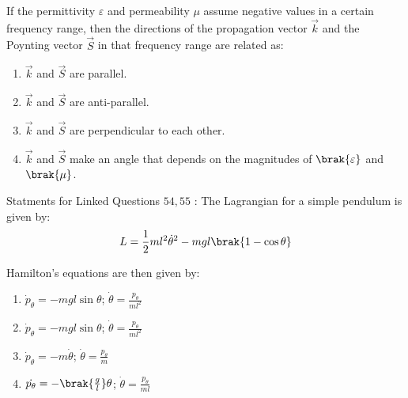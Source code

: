 \iffalse
                       
                        
                        
                        
                    
                        \author{AI24BTECH11006 - Bugada Roopansha}
                        \section{ph}
                        \chapter{2010}
                        \fi
 


    \item If the permittivity $ \varepsilon $ and permeability $ \mu $ assume negative values in a certain frequency range, then the directions of the propagation vector $ \vec{k} $ and the Poynting vector $ \vec{S} $ in that frequency range are related as:

    \begin{enumerate}
        \item $ \vec{k} $ and $ \vec{S} $ are parallel.
        \item $ \vec{k} $ and $ \vec{S} $ are anti-parallel.
        \item $ \vec{k} $ and $ \vec{S} $ are perpendicular to each other.
        \item $ \vec{k} $ and $ \vec{S} $ make an angle that depends on the magnitudes of $ \brak{\varepsilon} $ and $ \brak{\mu} $.
    \end{enumerate}
   Statments for Linked Questions $54,55$    :
     The Lagrangian for a simple pendulum is given by:
    \[
    L = \frac{1}{2} m l^2 \dot{\theta}^2 - mg l \brak{1 - \cos \theta}
    \]
    
   \item  Hamilton's equations are then given by:
    \begin{enumerate}
        \item $ \dot{p}_\theta = -mg l \sin \theta $; $ \dot{\theta} = \frac{p_\theta}{m l^2} $
        \item $ \dot{p}_\theta = -mg l \sin \theta $; $\dot{\theta} = \frac{p_\theta}{m l^2} $
        \item $ \dot{p}_\theta = -m \dot{\theta} $; $ \dot{\theta} = \frac{p_\theta}{m } $
        \item $ \dot{p_\theta}=-\brak{\frac{g}{l}} \theta $; $ \dot{\theta} = \frac{p_\theta}{m l} $
    \end{enumerate}

